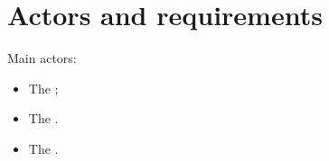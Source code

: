 \chapter{Actors and requirements}\label{ch:requirements}

Main actors:
\begin{itemize}
	\item The ;
	\item The .
	\item The .
\end{itemize}



